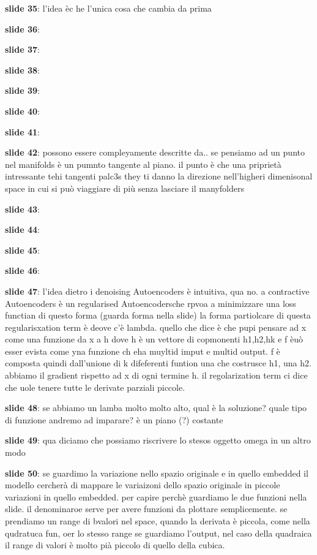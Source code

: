 \textbf{slide 35}: l'idea èc he l'unica cosa che cambia da prima 

\textbf{slide 36}:

\textbf{slide 37}:

\textbf{slide 38}:

\textbf{slide 39}:

\textbf{slide 40}: 

\textbf{slide 41}:

\textbf{slide 42}: possono essere compleyamente descritte da.. se pensiamo ad un punto nel manifolds 
è un pumnto tangente al piano. il punto è che una priprietà intressante tehi tangenti palc3s 
they ti danno la direzione nell'higheri dimenisonal space in cui si può viaggiare di più senza 
lasciare il manyfolders 

\textbf{slide 43}: 

\textbf{slide 44}:

\textbf{slide 45}: 

\textbf{slide 46}: 

\textbf{slide 47}: l'idea dietro i denoising Autoencoders è intuitiva, qua no. a contractive Autoencoders 
è un regularised Autoencodersche rpvoa a minimizzare una loss functian di questo forma (guarda forma nella 
slide) la forma partiolcare di questa regularisxation term è deove c'è lambda. quello che dice è che pupi 
pensare ad x come una funzione da x a h dove h è un vettore di copmonenti h1,h2,hk e f èuò esser evista 
come yna funzione ch eha muyltid imput e multid output. f è composta quindi dall'unione di k difeferenti 
funtion una che costrusce h1, una h2. abbiamo il gradient rispetto ad x di ogni termine h. il regolarization
term ci dice che uole tenere tutte le derivate parziali piccole. 

\textbf{slide 48}: se abbiamo un lamba molto molto alto, qual è la soluzione? quale tipo di funzione 
andremo ad imparare? è un piano (?) costante

\textbf{slide 49}: qua diciamo che possiamo riscrivere lo stesos oggetto omega in un altro modo

\textbf{slide 50}: se guardimo la variazione nello spazio originale e  in quello embedded il modello cercherà
di mappare le variaizoni dello spazio originale in piccole variazioni in quello embedded.
per capire perchè guardiamo le due funzioni nella slide. il denominaroe serve per avere funzioni da 
plottare semplicemente. se prendiamo un range di bvalori nel space, quando la derivata è piccola, 
come nella qudratuca fun, oer lo stesso range se guardiamo l'output, nel caso della quadraica il range di 
valori è molto pià piccolo di quello della cubica.

